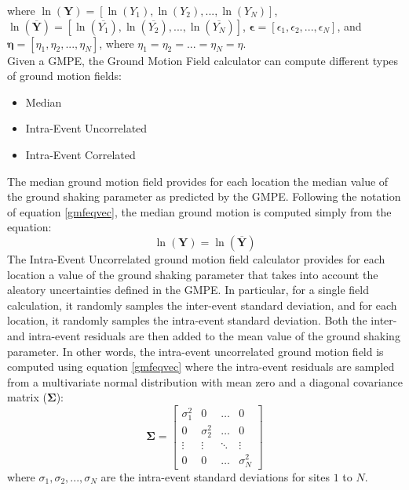 where ${\ln (\bm{Y})}=[\ln (Y_{1}), \ln (Y_{2}),...,\ln (Y_{N})]$, $\ln (\overline{\bm{Y}})=[\ln (\overline{Y_{1}}), \ln (\overline{Y_{2}}),...,\ln (\overline{Y_{N}})]$, $\bm{\epsilon}=[\epsilon_{1},\epsilon_{2},...,\epsilon_{N}]$, and $\bm{\eta}=[\eta_{1},\eta_{2},...,\eta_{N}]$, where $\eta_{1}=\eta_{2}=...=\eta_{N}=\eta$.\\
Given a GMPE, the Ground Motion Field calculator can compute different types of ground motion fields:
\begin{itemize}
\item Median
\item Intra-Event Uncorrelated
\item Intra-Event Correlated
\end{itemize}
The median ground motion field provides for each location the median value of the ground shaking parameter as predicted by the GMPE. Following the notation of equation \ref{gmfeqvec}, the median ground motion is computed simply from the equation:\\
\begin{equation}
\ln (\bm{Y}) = \ln (\overline{\bm{Y}})
\end{equation}
The Intra-Event Uncorrelated ground motion field calculator provides for each location a value of the ground shaking parameter that takes into account the aleatory uncertainties defined in the GMPE. In particular, for a single field calculation, it randomly samples the inter-event standard deviation, and for each location, it randomly samples the intra-event standard deviation. Both the inter- and intra-event residuals are then added to the mean value of the ground shaking parameter. In other words, the intra-event uncorrelated ground motion field is computed using equation \ref{gmfeqvec} where the intra-event residuals are sampled from a multivariate normal distribution with mean zero and a diagonal covariance matrix ($\bm{\Sigma}$):
\begin{equation}
\bm{\Sigma}=
\begin{bmatrix}
\sigma^{2}_{1} &  0  & \ldots & 0\\
0  &  \sigma^{2}_{2} & \ldots & 0\\
\vdots & \vdots & \ddots & \vdots\\
0  &   0       &\ldots & \sigma^{2}_{N}
\end{bmatrix}
\end{equation}
where $\sigma_{1}, \sigma_{2},...,\sigma_{N}$ are the intra-event standard deviations for sites $1$ to $N$.\\
